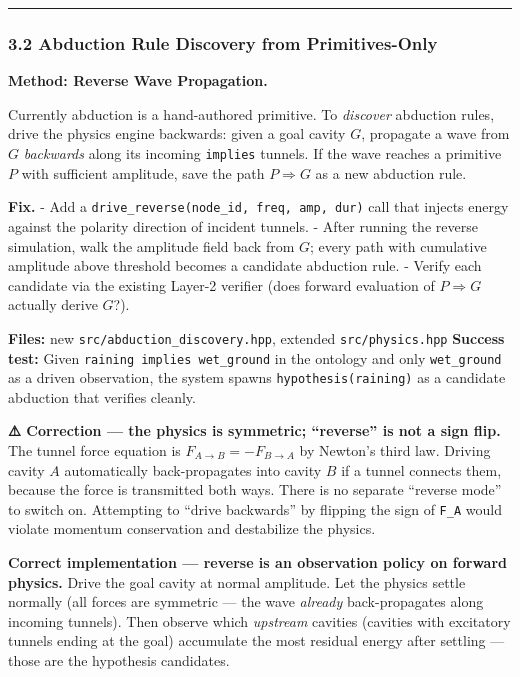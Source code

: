\documentclass[
  11pt,
  a4paper,
]{article}
\begin{document}
\begin{center}\rule{0.5\linewidth}{0.5pt}\end{center}

\subsubsection{3.2 Abduction Rule Discovery from
Primitives-Only}\label{abduction-rule-discovery-from-primitives-only}

\textbf{Method: Reverse Wave Propagation.}

Currently abduction is a hand-authored primitive. To \emph{discover}
abduction rules, drive the physics engine backwards: given a goal cavity
\(G\), propagate a wave from \(G\) \emph{backwards} along its incoming
\texttt{implies} tunnels. If the wave reaches a primitive \(P\) with
sufficient amplitude, save the path \(P \Rightarrow G\) as a new
abduction rule.

\textbf{Fix.} - Add a
\texttt{drive\_reverse(node\_id,\ freq,\ amp,\ dur)} call that injects
energy against the polarity direction of incident tunnels. - After
running the reverse simulation, walk the amplitude field back from
\(G\); every path with cumulative amplitude above threshold becomes a
candidate abduction rule. - Verify each candidate via the existing
Layer-2 verifier (does forward evaluation of \(P \Rightarrow G\)
actually derive \(G\)?).

\textbf{Files:} new \texttt{src/abduction\_discovery.hpp}, extended
\texttt{src/physics.hpp} \textbf{Success test:} Given
\texttt{raining\ implies\ wet\_ground} in the ontology and only
\texttt{wet\_ground} as a driven observation, the system spawns
\texttt{hypothesis(raining)} as a candidate abduction that verifies
cleanly.

\textbf{⚠️ Correction --- the physics is symmetric; ``reverse'' is not a
sign flip.} The tunnel force equation is \(F_{A \to B} = -F_{B \to A}\)
by Newton's third law. Driving cavity \(A\) automatically
back-propagates into cavity \(B\) if a tunnel connects them, because the
force is transmitted both ways. There is no separate ``reverse mode'' to
switch on. Attempting to ``drive backwards'' by flipping the sign of
\texttt{F\_A} would violate momentum conservation and destabilize the
physics.

\textbf{Correct implementation --- reverse is an observation policy on
forward physics.} Drive the goal cavity at normal amplitude. Let the
physics settle normally (all forces are symmetric --- the wave
\emph{already} back-propagates along incoming tunnels). Then observe
which \emph{upstream} cavities (cavities with excitatory tunnels ending
at the goal) accumulate the most residual energy after settling ---
those are the hypothesis candidates.
\end{document}
